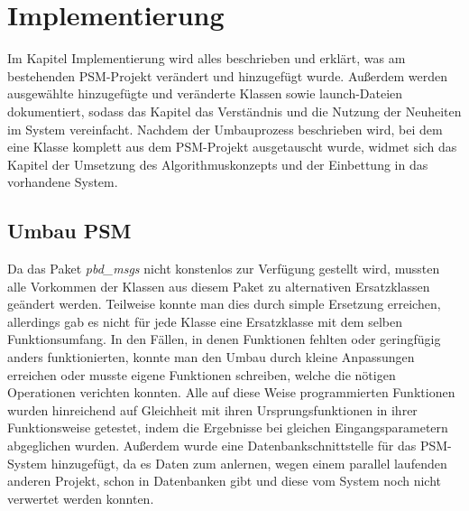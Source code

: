 \chapter{Implementierung}\label{ch:implementierung}

Im Kapitel Implementierung wird alles beschrieben und erklärt, was am bestehenden PSM-Projekt verändert und hinzugefügt wurde. Außerdem werden ausgewählte hinzugefügte und veränderte Klassen sowie launch-Dateien dokumentiert, sodass das Kapitel das Verständnis und die Nutzung der Neuheiten im System vereinfacht. Nachdem der Umbauprozess beschrieben wird, bei dem eine Klasse komplett aus dem PSM-Projekt ausgetauscht wurde, widmet sich das Kapitel der Umsetzung des Algorithmuskonzepts und der Einbettung in das vorhandene System.

\section{Umbau PSM}
Da das Paket \textit{pbd\_msgs} nicht konstenlos zur Verfügung gestellt wird, mussten alle Vorkommen der Klassen aus diesem Paket zu alternativen Ersatzklassen geändert werden. Teilweise konnte man dies durch simple Ersetzung erreichen, allerdings gab es nicht für jede Klasse eine Ersatzklasse mit dem selben Funktionsumfang. In den Fällen, in denen Funktionen fehlten oder geringfügig anders funktionierten, konnte man den Umbau durch kleine Anpassungen erreichen oder musste eigene Funktionen schreiben, welche die nötigen Operationen verichten konnten. Alle auf diese Weise programmierten Funktionen wurden hinreichend auf Gleichheit mit ihren Ursprungsfunktionen in ihrer Funktionsweise getestet, indem die Ergebnisse bei gleichen Eingangsparametern abgeglichen wurden. Außerdem wurde eine Datenbankschnittstelle für das PSM-System hinzugefügt, da es Daten zum anlernen, wegen einem parallel laufenden anderen Projekt, schon in Datenbanken gibt und diese vom System noch nicht verwertet werden konnten.
